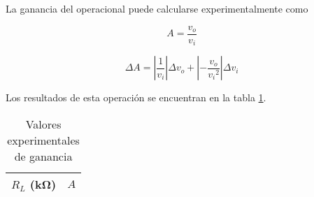 La ganancia del operacional puede calcularse experimentalmente como

\begin{equation}
    \label{ec:1-teoria:ganancia-experimental}
    A = \frac{v_o}{v_i}
\end{equation}

\begin{equation}
    \label{ec:1-teoria:err-ganancia-experimental}
    \Delta A = \left| \frac{1}{v_i} \right| \Delta v_o + \left| -\frac{v_o}{{v_i}^2} \right| \Delta v_i
\end{equation}

Los resultados de esta operación se encuentran en la tabla \ref{tab:1-teoria:ganancia-experimental}.


\begin{table}[H]
    \centering
    \begin{tabular}{@{}rr@{}}
        \toprule
        $R_L$ (\si{\kilo\ohm}) & $A$ \\
        \midrule
        
    \end{tabular}
    \caption{Valores experimentales de ganancia}
    \label{tab:1-teoria:ganancia-experimental}
\end{table}

